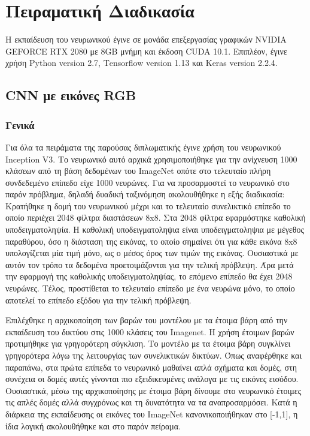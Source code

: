 \chapter{Πειραματική Διαδικασία}
\label{chap:5}
\thispagestyle{plain}
Η εκπαίδευση του νευρωνικού έγινε σε μονάδα επεξεργασίας γραφικών NVIDIA GEFORCE RTX 2080 με 8GB μνήμη και έκδοση CUDA 10.1. Επιπλέον, έγινε χρήση Python version 2.7, Τensorflow version 1.13 και Κeras version 2.2.4.  

\section{CNN με εικόνες RGB}
\label{sec:5.1}

\subsection{Γενικά}
\label{subsec:5.1.1}
Για όλα τα πειράματα της παρούσας διπλωματικής έγινε χρήση του νευρωνικού Inception V3. 
Το νευρωνικό αυτό αρχικά χρησιμοποιήθηκε για την ανίχνευση 1000 κλάσεων από τη βάση δεδομένων του ImageNet οπότε στο  τελευταίο πλήρη συνδεδεμένο επίπεδο είχε 1000 νευρώνες. Για να προσαρμοστεί το νευρωνικό στο παρόν πρόβλημα, δηλαδή δυαδική ταξινόμηση ακολουθήθηκε η εξής διαδικασία: Κρατήθηκε η δομή του νευρωνικού μέχρι και το τελευταίο συνελικτικό επίπεδο το οποίο περιέχει 2048 φίλτρα διαστάσεων 8x8. Στα 2048 φίλτρα εφαρμόστηκε καθολική υποδειγματοληψία. Η καθολική υποδειγματοληψια είναι υποδειγματοληψια με μέγεθος παραθύρου, όσο η διάσταση της εικόνας, το οποίο σημαίνει ότι για κάθε εικόνα  8x8 υπολογίζεται μία τιμή μόνο, ως ο μέσος όρος των τιμών της εικόνας. Ουσιαστικά με αυτόν τον τρόπο τα δεδομένα προετοιμάζονται για την τελική πρόβλεψη. Άρα μετά την εφαρμογή της καθολικής υποδειγματοληψίας, το επόμενο επίπεδο θα έχει 2048 νευρώνες.  Τέλος, προστίθεται το τελευταίο επίπεδο με ένα νευρώνα μόνο, το οποίο αποτελεί το επίπεδο εξόδου για την τελική πρόβλεψη. 
 

Επιλέχθηκε η αρχικοποίηση των βαρών του μοντέλου με τα έτοιμα βάρη από την εκπαίδευση του δικτύου στις 1000 κλάσεις του Imagenet. Η χρήση έτοιμων βαρών προτιμήθηκε για γρηγορότερη σύγκλιση. Το μοντέλο με τα έτοιμα βάρη συγκλίνει γρηγορότερα λόγω της λειτουργίας των συνελικτικών δικτύων. Όπως αναφέρθηκε και παραπάνω, στα πρώτα επίπεδα το νευρωνικό μαθαίνει απλά σχήματα και δομές, στη συνέχεια οι δομές αυτές γίνονται πιο εξειδικευμένες ανάλογα με τις εικόνες εισόδου. Ουσιαστικά, μέσω της αρχικοποίησης με έτοιμα βάρη δίνουμε στο νευρωνικό έτοιμες τις απλές δομές αλλά συγχρόνως και τη δυνατότητα να τα αναπροσαρμόσει. Κατά η διάρκεια της εκπαίδευσης οι εικόνες του ImageNet κανονικοποιήθηκαν στο [-1,1], η ίδια λογική ακολουθήθηκε και στο παρόν πείραμα.


